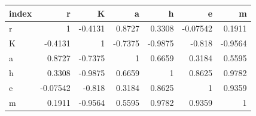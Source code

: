 \begin{tabular}{lrrrrrr}
\toprule
index & r & K & a & h & e & m \\
\midrule
r & 1 & -0.4131 & 0.8727 & 0.3308 & -0.07542 & 0.1911 \\
K & -0.4131 & 1 & -0.7375 & -0.9875 & -0.818 & -0.9564 \\
a & 0.8727 & -0.7375 & 1 & 0.6659 & 0.3184 & 0.5595 \\
h & 0.3308 & -0.9875 & 0.6659 & 1 & 0.8625 & 0.9782 \\
e & -0.07542 & -0.818 & 0.3184 & 0.8625 & 1 & 0.9359 \\
m & 0.1911 & -0.9564 & 0.5595 & 0.9782 & 0.9359 & 1 \\
\bottomrule
\end{tabular}
